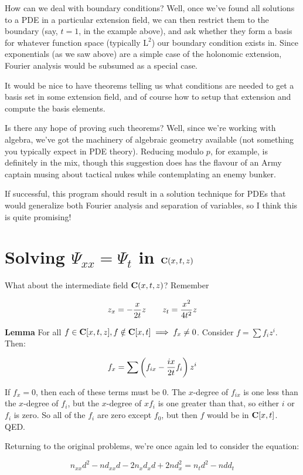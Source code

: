 \documentclass{article}
\newcommand{\C}{\ensuremath{{\bf C}}}
\begin{document}
How can we deal with boundary conditions?  Well, once we've found all
solutions to a PDE in a particular extension field, we can then
restrict them to the boundary (say, $t=1$, in the example above), and
ask whether they form a basis for whatever function space (typically
$\text{L}^2$) our boundary condition exists in.  Since exponentials
(as we saw above) are a simple case of the holonomic extension,
Fourier analysis would be subsumed as a special case.

It would be nice to have theorems telling us what conditions are
needed to get a basis set in some extension field, and of course how
to setup that extension and compute the basis elements.

Is there any hope of proving such theorems?  Well, since we're working
with algebra, we've got the machinery of algebraic geometry available
(not something you typically expect in PDE theory).  Reducing modulo
$p$, for example, is definitely in the mix, though this suggestion
does has the flavour of an Army captain musing about tactical nukes
while contemplating an enemy bunker.

If successful, this program should result in a solution technique for
PDEs that would generalize both Fourier analysis and separation of
variables, so I think this is quite promising!


\vfill\eject
\section*{Solving $\Psi_{xx}=\Psi_t$ in $\C(x,t,z)$}

What about the intermediate field $\C(x,t,z)$?  Remember

$$z_x = -{{x}\over{2t}} z \qquad z_t = {x^2\over{4t^2}} z$$

{\bf Lemma}  For all $f \in \C[x,t,z], f \notin \C[x,t] \implies f_x \ne 0$.
Consider $f = \sum f_i z^i$.  Then:

$$f_x = \sum \left( f_{ix} - {ix\over{2t}} f_i \right) z^i$$

If $f_x = 0$, then each of these terms must be 0.  The $x$-degree of $f_{ix}$
is one less than the $x$-degree of $f_i$, but the $x$-degree of $xf_i$ is
one greater than that, so either $i$ or $f_i$ is zero.  So all of the $f_i$
are zero except $f_0$, but then $f$ would be in $\C[x,t]$.  QED.

Returning to the original problems, we're once again led to consider the equation:

$$n_{xx} d^2 - n d_{xx} d - 2 n_{x}d_{x}d + 2nd_x^2 = n_t d^2 - n d d_t$$
\end{document}
